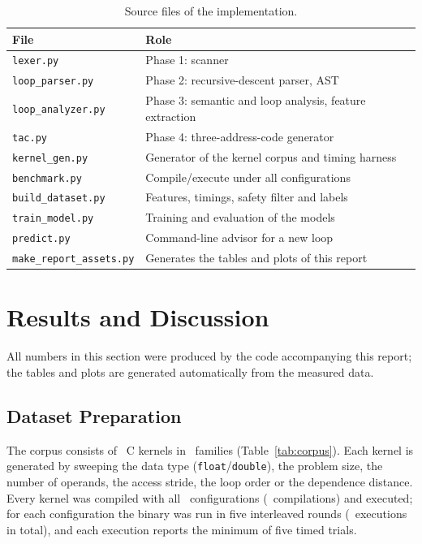 \documentclass[12pt,a4paper]{article}
\begin{document}
\begin{table}[H]
\centering
\caption{Source files of the implementation.}
\label{tab:files}
\small
\begin{tabular}{ll}
\toprule
\textbf{File} & \textbf{Role}\\
\midrule
\texttt{lexer.py} & Phase 1: scanner\\
\texttt{loop\_parser.py} & Phase 2: recursive-descent parser, AST\\
\texttt{loop\_analyzer.py} & Phase 3: semantic and loop analysis, feature extraction\\
\texttt{tac.py} & Phase 4: three-address-code generator\\
\texttt{kernel\_gen.py} & Generator of the kernel corpus and timing harness\\
\texttt{benchmark.py} & Compile/execute under all configurations\\
\texttt{build\_dataset.py} & Features, timings, safety filter and labels\\
\texttt{train\_model.py} & Training and evaluation of the models\\
\texttt{predict.py} & Command-line advisor for a new loop\\
\texttt{make\_report\_assets.py} & Generates the tables and plots of this report\\
\bottomrule
\end{tabular}
\end{table}

\newpage

\section{Results and Discussion}
\label{sec:results}

All numbers in this section were produced by the code accompanying this report;
the tables and plots are generated automatically from the measured data.

\subsection{Dataset Preparation}

The corpus consists of \numKernels\ C kernels in \numFamilies\ families
(Table~\ref{tab:corpus}). Each kernel is generated by sweeping the data type
(\texttt{float}/\texttt{double}), the problem size, the number of operands, the
access stride, the loop order or the dependence distance. Every kernel was
compiled with all \numConfigs\ configurations (\numCompiles\ compilations) and
executed; for each configuration the binary was run in five interleaved rounds
(\numRuns\ executions in total), and each execution reports the minimum of five
timed trials.
\end{document}
